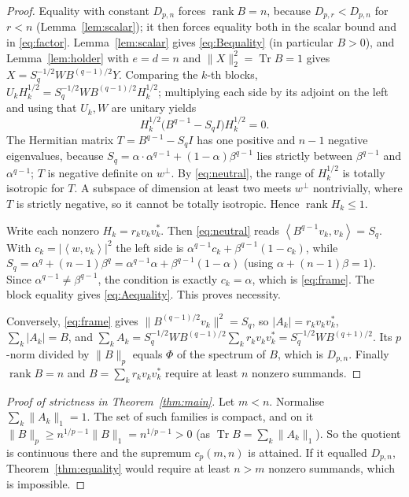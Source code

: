 \documentclass[11pt,a4paper]{article}
\numberwithin{equation}{section}
\theoremstyle{definition}
\theoremstyle{remark}
\DeclareMathOperator{\Tr}{Tr}
\DeclareMathOperator{\rank}{rank}
\newcommand{\abs}[1]{\left\lvert #1\right\rvert}
\newcommand{\ip}[2]{\left\langle #1,#2\right\rangle}
\begin{document}
\begin{proof}
Equality with constant \(D_{p,n}\) forces \(\rank B=n\), because
\(D_{p,r}<D_{p,n}\) for \(r<n\) (Lemma~\ref{lem:scalar}); it then forces
equality both in the scalar bound and in \eqref{eq:factor}.
Lemma~\ref{lem:scalar} gives \eqref{eq:Bequality}
(in particular \(B>0\)), and Lemma~\ref{lem:holder} with \(e=d=n\) and
\(\|X\|_2^2=\Tr B=1\) gives
\(X=S_q^{-1/2}WB^{(q-1)/2}Y\). Comparing the \(k\)-th blocks,
\(U_kH_k^{1/2}=S_q^{-1/2}WB^{(q-1)/2}H_k^{1/2}\); multiplying each side by
its adjoint on the left and using that \(U_k,W\) are unitary yields
\begin{equation}\label{eq:neutral}
 H_k^{1/2}\bigl(B^{q-1}-S_qI\bigr)H_k^{1/2}=0 .
\end{equation}
The Hermitian matrix \(T=B^{q-1}-S_qI\) has one positive and \(n-1\)
negative eigenvalues, because
\(S_q=\alpha\cdot\alpha^{q-1}+(1-\alpha)\beta^{q-1}\) lies strictly
between \(\beta^{q-1}\) and \(\alpha^{q-1}\); \(T\) is negative definite on
\(w^\perp\). By \eqref{eq:neutral}, the range of \(H_k^{1/2}\) is totally
isotropic for \(T\). A subspace of dimension at least two meets
\(w^\perp\) nontrivially, where \(T\) is strictly negative, so it cannot be
totally isotropic. Hence \(\rank H_k\le1\).

Write each nonzero \(H_k=r_kv_kv_k^*\). Then \eqref{eq:neutral} reads
\(\ip{B^{q-1}v_k}{v_k}=S_q\). With \(c_k=\abs{\ip{w}{v_k}}^2\) the left
side is \(\alpha^{q-1}c_k+\beta^{q-1}(1-c_k)\), while
\(S_q=\alpha^q+(n-1)\beta^q=\alpha^{q-1}\alpha+\beta^{q-1}(1-\alpha)\)
(using \(\alpha+(n-1)\beta=1\)). Since \(\alpha^{q-1}\ne\beta^{q-1}\), the
condition is exactly \(c_k=\alpha\), which is \eqref{eq:frame}. The block
equality gives \eqref{eq:Aequality}. This proves necessity.

Conversely, \eqref{eq:frame} gives \(\|B^{(q-1)/2}v_k\|^2=S_q\), so
\(|A_k|=r_kv_kv_k^*\), \(\sum_k|A_k|=B\), and
\(\sum_kA_k=S_q^{-1/2}WB^{(q-1)/2}\sum_kr_kv_kv_k^*=S_q^{-1/2}WB^{(q+1)/2}\).
Its \(p\)-norm divided by \(\|B\|_p\) equals \(\Phi\) of the spectrum of
\(B\), which is \(D_{p,n}\). Finally \(\rank B=n\) and
\(B=\sum_kr_kv_kv_k^*\) require at least \(n\) nonzero summands.
\end{proof}

\begin{proof}[Proof of strictness in Theorem~\ref{thm:main}]
Let \(m<n\). Normalise \(\sum_k\|A_k\|_1=1\). The set of such families is
compact, and on it \(\|B\|_p\ge n^{1/p-1}\|B\|_1=n^{1/p-1}>0\) (as
\(\Tr B=\sum_k\|A_k\|_1\)). So the quotient is continuous there and the
supremum \(c_p(m,n)\) is attained. If it equalled \(D_{p,n}\),
Theorem~\ref{thm:equality} would require at least \(n>m\) nonzero
summands, which is impossible.
\end{proof}
\end{document}
